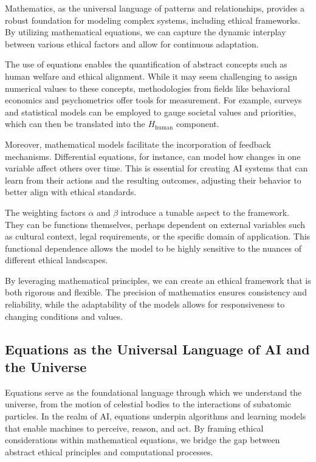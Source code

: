 \documentclass[12pt]{article}
\begin{document}
Mathematics, as the universal language of patterns and relationships, provides a robust foundation for modeling complex systems, including ethical frameworks. By utilizing mathematical equations, we can capture the dynamic interplay between various ethical factors and allow for continuous adaptation.

The use of equations enables the quantification of abstract concepts such as human welfare and ethical alignment. While it may seem challenging to assign numerical values to these concepts, methodologies from fields like behavioral economics and psychometrics offer tools for measurement. For example, surveys and statistical models can be employed to gauge societal values and priorities, which can then be translated into the $H_{\text{human}}$ component.

Moreover, mathematical models facilitate the incorporation of feedback mechanisms. Differential equations, for instance, can model how changes in one variable affect others over time. This is essential for creating AI systems that can learn from their actions and the resulting outcomes, adjusting their behavior to better align with ethical standards.

The weighting factors $\alpha$ and $\beta$ introduce a tunable aspect to the framework. They can be functions themselves, perhaps dependent on external variables such as cultural context, legal requirements, or the specific domain of application. This functional dependence allows the model to be highly sensitive to the nuances of different ethical landscapes.

By leveraging mathematical principles, we can create an ethical framework that is both rigorous and flexible. The precision of mathematics ensures consistency and reliability, while the adaptability of the models allows for responsiveness to changing conditions and values.


\subsection{Equations as the Universal Language of AI and the Universe}

Equations serve as the foundational language through which we understand the universe, from the motion of celestial bodies to the interactions of subatomic particles. In the realm of AI, equations underpin algorithms and learning models that enable machines to perceive, reason, and act. By framing ethical considerations within mathematical equations, we bridge the gap between abstract ethical principles and computational processes.
\end{document}
